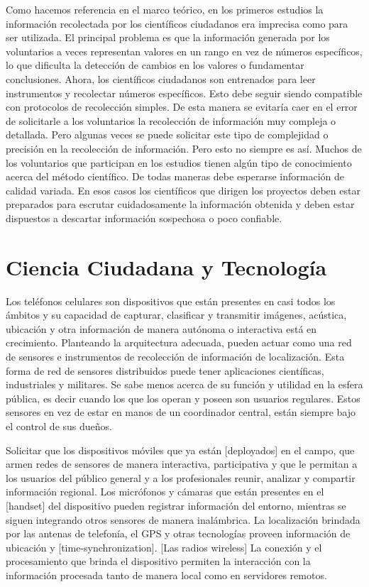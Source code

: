 	Como hacemos referencia en el marco teórico, en los primeros estudios la información recolectada por los científicos ciudadanos era imprecisa como para ser utilizada. El principal problema es que la información generada por los voluntarios a veces representan valores en un rango en vez de números específicos, lo que dificulta la detección de cambios en los valores o fundamentar conclusiones. Ahora, los científicos ciudadanos son entrenados para leer instrumentos y recolectar números específicos. Esto debe seguir siendo compatible con protocolos de recolección simples. De esta manera se evitaría caer en el error de solicitarle a los voluntarios la recolección de información muy compleja o detallada. Pero algunas veces se puede solicitar este tipo de complejidad o precisión en la recolección de información. Pero esto no siempre es así. Muchos de los voluntarios que participan en los estudios tienen algún tipo de conocimiento acerca del método científico. De todas maneras debe esperarse información de calidad variada. En esos casos los científicos que dirigen los proyectos deben estar preparados para escrutar cuidadosamente la información obtenida y deben estar dispuestos a descartar información sospechosa o poco confiable.
	
	
	


\section{Ciencia Ciudadana y Tecnología}

	Los teléfonos celulares son dispositivos que están presentes en casi todos los ámbitos y su capacidad de capturar, clasificar y transmitir imágenes, acústica, ubicación y otra información de manera autónoma o interactiva está en crecimiento.
Planteando la arquitectura adecuada, pueden actuar como una red de sensores e instrumentos de recolección de información de localización. 
Esta forma de red de sensores distribuidos puede tener aplicaciones científicas, industriales y militares. Se sabe menos acerca de su función y utilidad en la esfera pública, es decir cuando los que los operan y poseen son usuarios regulares.   Estos sensores en vez de estar en manos de un coordinador central, están siempre bajo el control de sus dueños.

	Solicitar que los dispositivos móviles que ya están [deployados] en el campo, que armen redes de sensores de manera interactiva, participativa y que le permitan a los usuarios del público general y a los profesionales reunir, analizar y compartir información regional. Los micrófonos y cámaras que están presentes en el [handset] del dispositivo pueden registrar información del entorno, mientras se siguen integrando otros sensores de manera inalámbrica. La localización brindada por las antenas de telefonía, el GPS y otras tecnologías proveen información de ubicación y [time-synchronization]. [Las radios wireless] La conexión y el procesamiento que brinda el dispositivo permiten la interacción con la información procesada tanto de manera local como en servidores remotos. 
	
